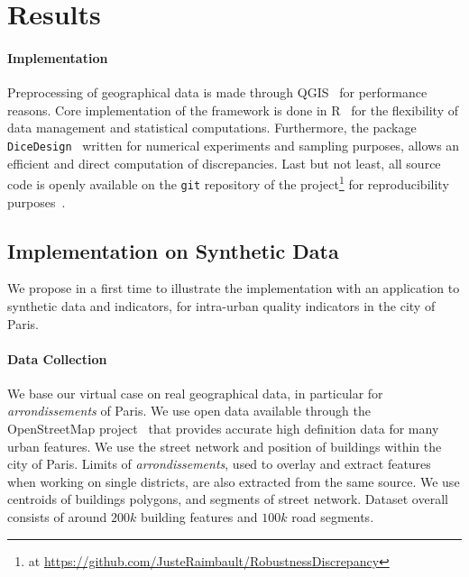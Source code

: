 \documentclass[runningheads,a4paper]{llncs2e/llncs}
\begin{document}
\section{Results}



\paragraph{Implementation}

Preprocessing of geographical data is made through QGIS~\cite{qgis2011quantum} for performance reasons. Core implementation of the framework is done in R~\cite{team2000r} for the flexibility of data management and statistical computations. Furthermore, the package \texttt{DiceDesign}~\cite{franco20092} written for numerical experiments and sampling purposes, allows an efficient and direct computation of discrepancies. Last but not least, all source code is openly available on the \texttt{git} repository of the project\footnote{at \url{https://github.com/JusteRaimbault/RobustnessDiscrepancy}} for reproducibility purposes~\cite{ram2013git}.




\subsection{Implementation on Synthetic Data}

We propose in a first time to illustrate the implementation with an application to synthetic data and indicators, for intra-urban quality indicators in the city of Paris.

\paragraph{Data Collection}

We base our virtual case on real geographical data, in particular for \emph{arrondissements} of Paris. We use open data available through the OpenStreetMap project~\cite{bennett2010openstreetmap} that provides accurate high definition data for many urban features. We use the street network and position of buildings within the city of Paris. %
Limits of \emph{arrondissements}, used to overlay and extract features when working on single districts, are also extracted from the same source. We use centroids of buildings polygons, and segments of street network. Dataset overall consists of around $200k$ building features and $100k$ road segments.
\end{document}
